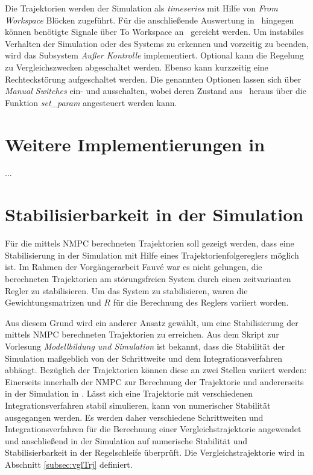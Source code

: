 Die Trajektorien werden der Simulation als \textit{timeseries} mit Hilfe von \textit{From Workspace} Blöcken zugeführt. Für die anschließende Auswertung in \Matlab\ hingegen können benötigte Signale über To Workspace an \Matlab\ gereicht werden. Um instabiles Verhalten der Simulation oder des Systems zu erkennen und vorzeitig zu beenden, wird das Subsystem \textit{Außer Kontrolle} implementiert. Optional kann die Regelung zu Vergleichszwecken abgeschaltet werden. Ebenso kann kurzzeitig eine Rechteckstörung aufgeschaltet werden. Die genannten Optionen lassen sich über \textit{Manual Switches} ein- und ausschalten, wobei deren Zustand aus \Matlab\ heraus über die Funktion \textit{set\_param} angesteuert werden kann.

\section{Weitere Implementierungen in \Matlab}
...


\section{Stabilisierbarkeit in der Simulation}\label{stabiltrj}

\newcommand{\scaleyplots}{0.6}

Für die mittels NMPC berechneten Trajektorien soll gezeigt werden, dass eine Stabilisierung in der Simulation mit Hilfe eines Trajektorienfolgereglers möglich ist. Im Rahmen der Vorgängerarbeit Fauvé \cite{fauve} war es nicht gelungen, die berechneten Trajektorien am störungsfreien System durch einen zeitvarianten Regler zu stabilisieren. Um das System zu stabilisieren, waren die Gewichtungsmatrizen  und $R$ für die Berechnung des Reglers variiert worden.

Aus diesem Grund wird ein anderer Ansatz gewählt, um eine Stabilisierung der mittels NMPC berechneten Trajektorien zu erreichen. Aus dem Skript \cite{modsim} zur Vorlesung \textit{Modellbildung und Simulation} ist bekannt, dass die Stabilität der Simulation maßgeblich von der Schrittweite und dem Integrationsverfahren abhängt. Bezüglich der Trajektorien können diese an zwei Stellen variiert werden: Einerseits innerhalb der NMPC zur Berechnung der Trajektorie und andererseits in der Simulation in \Simulink. Lässt sich eine Trajektorie mit verschiedenen Integrationsverfahren stabil simulieren, kann von numerischer Stabilität ausgegangen werden. Es werden daher verschiedene Schrittweiten und Integrationsverfahren für die Berechnung einer Vergleichstrajektorie angewendet und anschließend in der Simulation auf numerische Stabilität und Stabilisierbarkeit in der Regelschleife überprüft. Die Vergleichstrajektorie wird in Abschnitt \ref{subsec:vglTrj} definiert.

